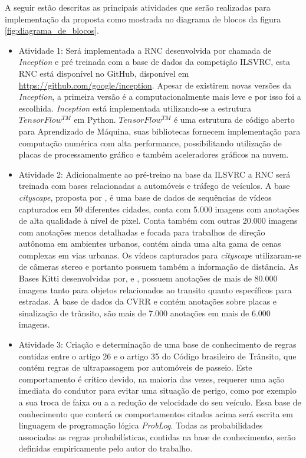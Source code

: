 \documentclass[
	12pt,				%
    oneside,			%
	a4paper,			%
	english,			%
	french,				%
	spanish,			%
	brazil,				%
	]{abntex2}
\begin{document}
A seguir estão descritas as principais atividades que serão realizadas para implementação da proposta como mostrada no diagrama de blocos da figura \ref{fig:diagrama_de_blocos}. 


\begin{itemize}
   

 \item Atividade 1: Será implementada a RNC desenvolvida por  chamada de \textit{Inception} e pré treinada com a base de dados da competição ILSVRC, esta RNC está disponível no GitHub, disponível em \url{https://github.com/google/inception}. Apesar de existirem novas versões da \textit{Inception}, a primeira versão é a computacionalmente mais leve e por isso foi a escolhida. \textit{Inception} está implementada utilizando-se a estrutura $TensorFlow^{TM}$ em Python. $TensorFlow^{TM}$ é uma estrutura de código aberto para Aprendizado de Máquina, suas bibliotecas fornecem implementação para computação numérica com alta performance, possibilitando utilização de placas de processamento gráfico e também aceleradores gráficos na nuvem. 
 

 \item Atividade 2: Adicionalmente ao pré-treino na base da ILSVRC a RNC será treinada com bases relacionadas a automóveis e tráfego de veículos.\newline
 A base \textit{cityscape}, proposta por , é uma base de dados de sequências de vídeos capturados em 50 diferentes cidades, conta com 5.000 imagens com anotações de alta qualidade à nível de pixel. Conta também com outras 20.000 imagens com anotações menos detalhadas e focada para trabalhos de direção autônoma em ambientes urbanos, contém ainda uma alta gama de cenas complexas em vias urbanas. Os vídeos capturados para \textit{cityscape} utilizaram-se de câmeras stereo e portanto possuem também a informação de distância.\newline
 As Bases Kitti desenvolvidas por,  e , possuem anotações de mais de 80.000 imagens tanto para objetos relacionados ao transito quanto específicos para estradas.\newline
 A base de dados da CVRR  e  contém anotações sobre placas e sinalização de trânsito, são mais de 7.000 anotações em mais de 6.000 imagens.
 
 \item Atividade 3: Criação e determinação de uma base de conhecimento de regras contidas entre o artigo 26 e o artigo 35 do Código brasileiro de Trânsito, que contém regras de ultrapassagem por automóveis de passeio. Este comportamento é crítico devido, na maioria das vezes, requerer uma ação imediata do condutor para evitar uma situação de perigo, como por exemplo a sua troca de faixa ou a a redução de velocidade do seu veículo. Essa base de conhecimento que conterá os comportamentos citados acima será escrita em linguagem de programação lógica \textit{ProbLog}. Todas as probabilidades associadas as regras probabilísticas, contidas na base de conhecimento, serão definidas empiricamente pelo autor do trabalho.  
 

\end{itemize}
\end{document}
